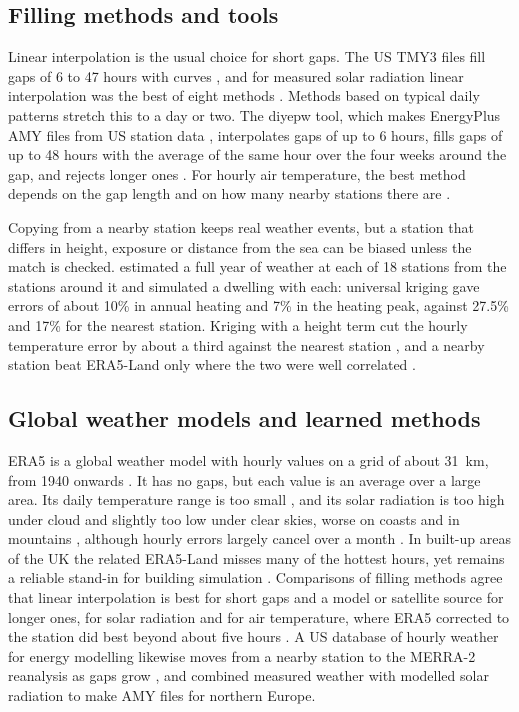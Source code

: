 \subsection{Filling methods and tools}\label{sec:2.1}

Linear interpolation is the usual choice for short gaps. The US TMY3 files fill gaps of 6 to 47 hours with curves \citep{wilcox2008}, and for measured solar radiation linear interpolation was the best of eight methods \citep{nrel2021}. Methods based on typical daily patterns stretch this to a day or two. The diyepw tool, which makes EnergyPlus AMY files from US station data \citep{smith2021}, interpolates gaps of up to 6 hours, fills gaps of up to 48 hours with the average of the same hour over the four weeks around the gap, and rejects longer ones \citep{diyepw2023}. For hourly air temperature, the best method depends on the gap length and on how many nearby stations there are \citep{henn2013,hu2014}.

Copying from a nearby station keeps real weather events, but a station that differs in height, exposure or distance from the sea can be biased unless the match is checked. \citet{eguiaoller2017} estimated a full year of weather at each of 18 stations from the stations around it and simulated a dwelling with each: universal kriging gave errors of about 10\% in annual heating and 7\% in the heating peak, against 27.5\% and 17\% for the nearest station. Kriging with a height term cut the hourly temperature error by about a third against the nearest station \citep{rosillon2024}, and a nearby station beat ERA5-Land only where the two were well correlated \citep{sirpapoma2025}.

\subsection{Global weather models and learned methods}\label{sec:2.2}

ERA5 is a global weather model with hourly values on a grid of about 31~km, from 1940 onwards \citep{hersbach2020,soci2024}. It has no gaps, but each value is an average over a large area. Its daily temperature range is too small \citep{lopes2024}, and its solar radiation is too high under cloud and slightly too low under clear skies, worse on coasts and in mountains \citep{urraca2018}, although hourly errors largely cancel over a month \citep{babar2019}. In built-up areas of the UK the related ERA5-Land misses many of the hottest hours, yet remains a reliable stand-in for building simulation \citep{yu2026}. Comparisons of filling methods agree that linear interpolation is best for short gaps and a model or satellite source for longer ones, for solar radiation \citep{ieapvps2023} and for air temperature, where ERA5 corrected to the station did best beyond about five hours \citep{jacobs2024}. A US database of hourly weather for energy modelling likewise moves from a nearby station to the MERRA-2 reanalysis as gaps grow \citep{wang2024}, and \citet{lundstrom2012} combined measured weather with modelled solar radiation to make AMY files for northern Europe.

